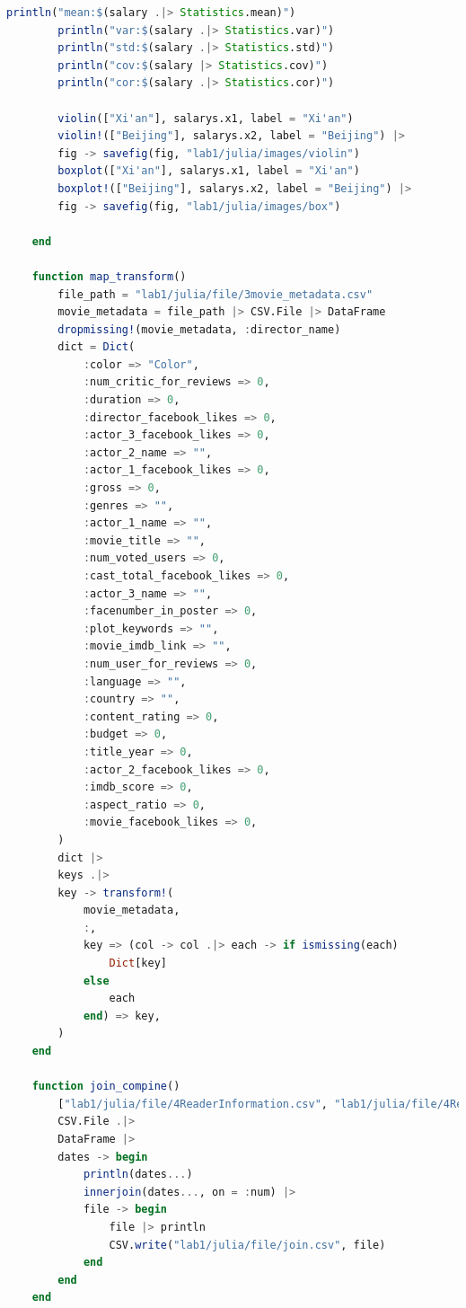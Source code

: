 \documentclass[a4paper]{article}
\begin{document}
\begin{lstlisting}[language=julia]
        println("mean:$(salary .|> Statistics.mean)")
        println("var:$(salary .|> Statistics.var)")
        println("std:$(salary .|> Statistics.std)")
        println("cov:$(salary |> Statistics.cov)")
        println("cor:$(salary .|> Statistics.cor)")
    
        violin(["Xi'an"], salarys.x1, label = "Xi'an")
        violin!(["Beijing"], salarys.x2, label = "Beijing") |>
        fig -> savefig(fig, "lab1/julia/images/violin")
        boxplot(["Xi'an"], salarys.x1, label = "Xi'an")
        boxplot!(["Beijing"], salarys.x2, label = "Beijing") |>
        fig -> savefig(fig, "lab1/julia/images/box")
    
    end
    
    function map_transform()
        file_path = "lab1/julia/file/3movie_metadata.csv"
        movie_metadata = file_path |> CSV.File |> DataFrame
        dropmissing!(movie_metadata, :director_name)
        dict = Dict(
            :color => "Color",
            :num_critic_for_reviews => 0,
            :duration => 0,
            :director_facebook_likes => 0,
            :actor_3_facebook_likes => 0,
            :actor_2_name => "",
            :actor_1_facebook_likes => 0,
            :gross => 0,
            :genres => "",
            :actor_1_name => "",
            :movie_title => "",
            :num_voted_users => 0,
            :cast_total_facebook_likes => 0,
            :actor_3_name => "",
            :facenumber_in_poster => 0,
            :plot_keywords => "",
            :movie_imdb_link => "",
            :num_user_for_reviews => 0,
            :language => "",
            :country => "",
            :content_rating => 0,
            :budget => 0,
            :title_year => 0,
            :actor_2_facebook_likes => 0,
            :imdb_score => 0,
            :aspect_ratio => 0,
            :movie_facebook_likes => 0,
        )
        dict |>
        keys .|>
        key -> transform!(
            movie_metadata,
            :,
            key => (col -> col .|> each -> if ismissing(each)
                Dict[key]
            else
                each
            end) => key,
        )
    end
    
    function join_compine()
        ["lab1/julia/file/4ReaderInformation.csv", "lab1/julia/file/4ReaderRentRecode.csv"] .|>
        CSV.File .|>
        DataFrame |>
        dates -> begin
            println(dates...)
            innerjoin(dates..., on = :num) |>
            file -> begin
                file |> println
                CSV.write("lab1/julia/file/join.csv", file)
            end
        end
    end
    

\end{lstlisting}
\end{document}
